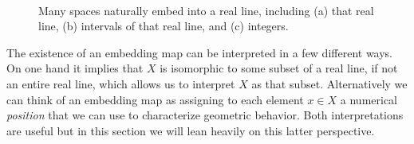 \documentclass[
  letterpaper,
  DIV=11,
  numbers=noendperiod]{scrartcl}
\begin{document}
\begin{figure}
\begin{minipage}[t]{0.30\linewidth}
{{}

}

\subcaption{\label{fig-interval}}
\end{minipage}%
%
\begin{minipage}[t]{0.30\linewidth}

{\centering 


}

\subcaption{\label{fig-integer}}
\end{minipage}%
%
\begin{minipage}[t]{0.05\linewidth}

{\centering 

~

}

\end{minipage}%

\caption{\label{fig-integrate}Many spaces naturally embed into a real
line, including (a) that real line, (b) intervals of that real line, and
(c) integers.}

\end{figure}

The existence of an embedding map can be interpreted in a few different
ways. On one hand it implies that \(X\) is isomorphic to some subset of
a real line, if not an entire real line, which allows us to interpret
\(X\) as that subset. Alternatively we can think of an embedding map as
assigning to each element \(x \in X\) a numerical \emph{position} that
we can use to characterize geometric behavior. Both interpretations are
useful but in this section we will lean heavily on this latter
perspective.
\end{document}
